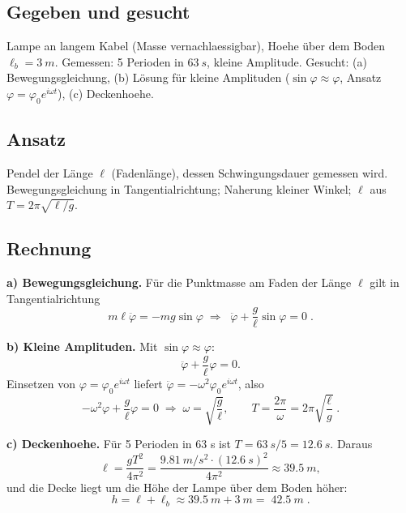 
\subsection*{Gegeben und gesucht}
Lampe an langem Kabel (Masse vernachlaessigbar), Hoehe über dem Boden
$\ell_b=\qty{3}{m}$. Gemessen: 5 Perioden in $\qty{63}{s}$, kleine
Amplitude. Gesucht: (a) Bewegungsgleichung, (b) Lösung für kleine
Amplituden ($\sin\varphi\approx\varphi$, Ansatz $\varphi=\varphi_0e^{i\omega t}$),
(c) Deckenhoehe.

\subsection*{Ansatz}
Pendel der Länge $\ell$ (Fadenlänge), dessen Schwingungsdauer gemessen
wird. Bewegungsgleichung in Tangentialrichtung; Naherung kleiner Winkel;
$\ell$ aus $T=2\pi\sqrt{\ell/g}$.

\subsection*{Rechnung}
\textbf{a) Bewegungsgleichung.} Für die Punktmasse am Faden der Länge
$\ell$ gilt in Tangentialrichtung
\begin{equation}
  m\ell\ddot\varphi=-mg\sin\varphi
  \;\Rightarrow\;
  \boxed{\;\ddot\varphi+\frac{g}{\ell}\sin\varphi=0\;}.
\end{equation}

\textbf{b) Kleine Amplituden.} Mit $\sin\varphi\approx\varphi$:
\begin{equation}
  \ddot\varphi+\frac{g}{\ell}\varphi=0.
\end{equation}
Einsetzen von $\varphi=\varphi_0e^{i\omega t}$ liefert
$\ddot\varphi=-\omega^2\varphi_0e^{i\omega t}$, also
\begin{equation}
  -\omega^2\varphi+\frac{g}{\ell}\varphi=0
  \;\Rightarrow\;\omega=\sqrt{\frac{g}{\ell}},\qquad
  T=\frac{2\pi}{\omega}=2\pi\sqrt{\frac{\ell}{g}}\;.
\end{equation}

\textbf{c) Deckenhoehe.} Für 5 Perioden in 63 s ist
$T=\qty{63}{s}/5=\qty{12.6}{s}$. Daraus
\begin{equation}
  \ell=\frac{g T^2}{4\pi^2}
  =\frac{\qty{9.81}{m/s^2}\cdot(\qty{12.6}{s})^2}{4\pi^2}
  \approx\qty{39.5}{m},
\end{equation}
und die Decke liegt um die H\"ohe der Lampe {\"u}ber dem Boden h{\"o}her:
\begin{equation}
  h=\ell+\ell_b\approx\qty{39.5}{m}+\qty{3}{m}=\boxed{\;\qty{42.5}{m}\;}.
\end{equation}


